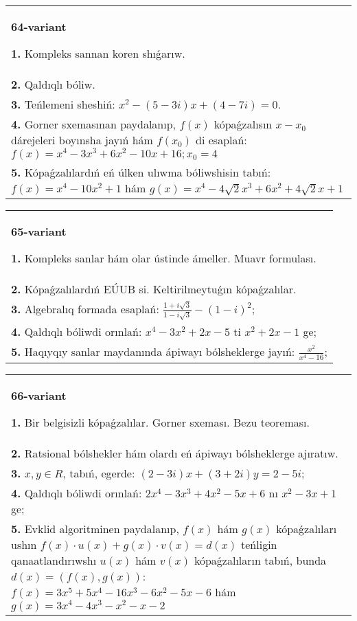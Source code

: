 \documentclass{article}
\begin{document}
\begin{tabular}{m{17cm}}
\textbf{64-variant}
\newline

\textbf{1.} Kompleks sannan koren shıǵarıw. \\
\textbf{2.} Qaldıqlı bóliw.  \\
\textbf{3.} Teńlemeni sheshiń:  $x^2-(5-3 i) x+(4-7 i)=0$. \\
\textbf{4.} Gorner sxemasınan paydalanıp, $f(x)$ kópaǵzalısın $x-x_0$ dárejeleri boyınsha jayıń hám $f\left(x_0\right)$ di esaplań: $f(x)=x^4-3 x^3+6 x^2-10 x+16 ; x_0=4$ \\
\textbf{5.} Kópaǵzalılardıń eń úlken ulıwma bóliwshisin tabıń:  $f(x)=x^4-10 x^2+1$ hám $g(x)=x^4-4 \sqrt{2} x^3+6 x^2+4 \sqrt{2} x+1$ \\

\end{tabular}
\vspace{1cm}


\begin{tabular}{m{17cm}}
\textbf{65-variant}
\newline

\textbf{1.} Kompleks sanlar hám olar ústinde ámeller. Muavr formulası.  \\
\textbf{2.} Kópaǵzalılardıń EÚUB si. Keltirilmeytuǵın   kópaǵzalılar. \\
\textbf{3.} Algebralıq formada esaplań: $\frac{1+i \sqrt{3}}{1-i \sqrt{3}}-(1-i)^2$; \\
\textbf{4.} Qaldıqlı bóliwdi orınlań: $x^4-3 x^2+2 x-5$ ti $x^2+2 x-1$ ge; \\
\textbf{5.} Haqıyqıy sanlar maydanında ápiwayı bólsheklerge jayıń:  $\frac{x^2}{x^4-16}$; \\

\end{tabular}
\vspace{1cm}


\begin{tabular}{m{17cm}}
\textbf{66-variant}
\newline

\textbf{1.} Bir belgisizli kópaǵzalılar. Gorner sxeması. Bezu teoreması.  \\
\textbf{2.} Ratsional bólshekler hám olardı eń ápiwayı bólsheklerge ajıratıw. \\
\textbf{3.}  $x, y \in R$, tabıń, egerde: $(2-3 i) x+(3+2 i) y=2-5 i$; \\
\textbf{4.} Qaldıqlı bóliwdi orınlań: $2 x^4-3 x^3+4 x^2-5 x+6$ nı $x^2-3 x+1$ ge; \\
\textbf{5.} Evklid algoritminen paydalanıp, $f(x)$ hám $g(x)$ kópaǵzalıları ushın $f(x) \cdot u(x)+g(x) \cdot v(x)=d(x)$ teńligin qanaatlandırıwshı $u(x)$ hám $v(x)$ kópaǵzalıların tabıń, bunda $d(x)=(f(x), g(x))$:  $f(x)=3 x^5+5 x^4-16 x^3-6 x^2-5 x-6$ hám $g(x)=3 x^4-4 x^3-x^2-x-2$ \\

\end{tabular}
\vspace{1cm}
\end{document}
